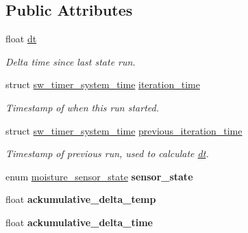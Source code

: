 \subsection*{Public Attributes}
\begin{DoxyCompactItemize}
\item 
float \hyperlink{structirrigation__controller__status_a0a4447a8aa2200bacf97bd7e844493c1}{dt}
\begin{DoxyCompactList}\small\item\em Delta time since last state run. \end{DoxyCompactList}\item 
struct \hyperlink{structsw__timer__system__time}{sw\+\_\+timer\+\_\+system\+\_\+time} \hyperlink{structirrigation__controller__status_a1ae5ffb12725754d8309452cf24a2a28}{iteration\+\_\+time}
\begin{DoxyCompactList}\small\item\em Timestamp of when this run started. \end{DoxyCompactList}\item 
struct \hyperlink{structsw__timer__system__time}{sw\+\_\+timer\+\_\+system\+\_\+time} \hyperlink{structirrigation__controller__status_ab5a5ed310a96d8fd4db605bad57bf83a}{previous\+\_\+iteration\+\_\+time}
\begin{DoxyCompactList}\small\item\em Timestamp of previous run, used to calculate \hyperlink{structirrigation__controller__status_a0a4447a8aa2200bacf97bd7e844493c1}{dt}. \end{DoxyCompactList}\item 
\hypertarget{structirrigation__controller__status_a113b7e81a993c20bb5bf90b2faf81bc5}{}enum \hyperlink{irrigation_8h_a9891f6b3b37611d2aebdb8601acdf6c6}{moisture\+\_\+sensor\+\_\+state} {\bfseries sensor\+\_\+state}\label{structirrigation__controller__status_a113b7e81a993c20bb5bf90b2faf81bc5}

\item 
\hypertarget{structirrigation__controller__status_a9f6f7c1cab26fb9200e9ab706098cb98}{}float {\bfseries ackumulative\+\_\+delta\+\_\+temp}\label{structirrigation__controller__status_a9f6f7c1cab26fb9200e9ab706098cb98}

\item 
\hypertarget{structirrigation__controller__status_a6b0753e3ea72f0220cb51e9e14d817ba}{}float {\bfseries ackumulative\+\_\+delta\+\_\+time}\label{structirrigation__controller__status_a6b0753e3ea72f0220cb51e9e14d817ba}


\end{DoxyCompactItemize}
